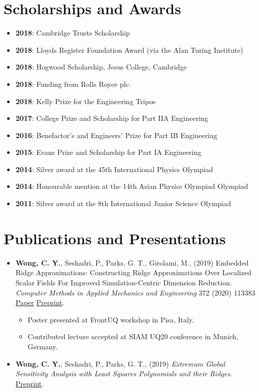 \documentclass[letterpaper,11pt,oneside]{article}
\begin{document}
\section*{Scholarships and Awards}
\begin{itemize}
\item \textbf{2018}: Cambridge Trusts Scholarship 
\item \textbf{2018}: Lloyds Register Foundation Award (via the Alan Turing Institute)
\item \textbf{2018}: Hogwood Scholarship, Jesus College, Cambridge
\item \textbf{2018}: Funding from Rolls Royce plc. 
\item \textbf{2018}: Kelly Prize for the Engineering Tripos
\item \textbf{2017}: College Prize and Scholarship for Part IIA Engineering
\item \textbf{2016}: Benefactor’s and Engineers’ Prize for Part IB Engineering
\item \textbf{2015}: Evans Prize and Scholarship for Part IA Engineering
\item \textbf{2014}: Silver award at the 45th International Physics Olympiad
\item \textbf{2014}: Honourable mention at the 14th Asian Physics Olympiad Olympiad
\item \textbf{2011}: Silver award at the 8th International Junior Science Olympiad
\end{itemize}

\section*{Publications and Presentations}
\begin{itemize}
\item \textbf{Wong, C. Y.}, Seshadri, P., Parks, G. T., Girolami, M., (2019) Embedded Ridge Approximations: Constructing Ridge Approximations Over Localized Scalar Fields For Improved Simulation-Centric Dimension Reduction. \emph{Computer Methods in Applied Mechanics and Engineering} 372 (2020) 113383 \href{https://doi.org/10.1016/j.cma.2020.113383}{Paper}  \href{https://arxiv.org/abs/1907.07037}{Preprint}. 
\begin{itemize}
\item Poster presented at FrontUQ workshop in Pisa, Italy. 
\item Contributed lecture accepted at SIAM UQ20 conference in Munich, Germany.
\end{itemize}

\item \textbf{Wong, C. Y.}, Seshadri, P., Parks, G. T., (2019) \emph{Extremum Global Sensitivity Analysis with Least Squares Polynomials and their Ridges}. \href{https://arxiv.org/abs/1907.08113}{Preprint}.
\end{itemize}
\end{document}

